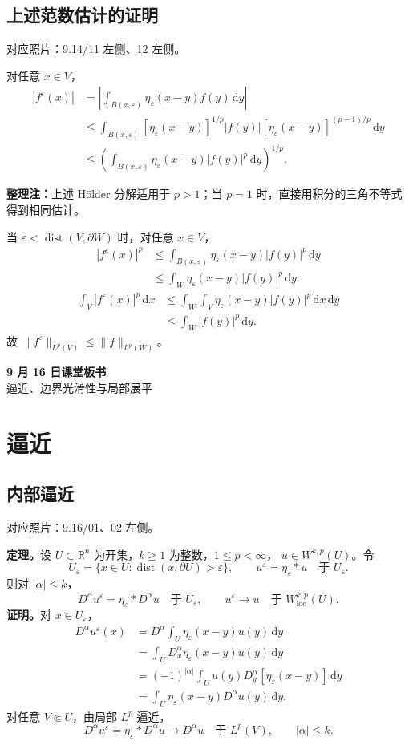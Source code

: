 \documentclass[UTF8,a4paper,11pt,fontset=fandol]{ctexart}
\newcommand{\R}{\mathbb R}
\newcommand{\dd}{\,\mathrm d}
\newcommand{\ednote}[1]{\par{\small\color{notegray}\textbf{整理注：}#1}\par}
\newcommand{\source}[1]{{\small\color{notegray}对应照片：#1。}\par}
\begin{document}
\subsection*{上述范数估计的证明}
\source{9.14/11 左侧、12 左侧}
对任意 $x\in V$，
\[
\begin{aligned}
|f^\varepsilon(x)|
&=\left|\int_{B(x,\varepsilon)}\eta_\varepsilon(x-y)f(y)\dd y\right|\\
&\leq\int_{B(x,\varepsilon)}[\eta_\varepsilon(x-y)]^{1/p}|f(y)|
[\eta_\varepsilon(x-y)]^{(p-1)/p}\dd y\\
&\leq\left(\int_{B(x,\varepsilon)}\eta_\varepsilon(x-y)|f(y)|^p\dd y\right)^{1/p}.
\end{aligned}
\]
\ednote{上述 Hölder 分解适用于 $p>1$；当 $p=1$ 时，直接用积分的三角不等式得到相同估计。}
当 $\varepsilon<\operatorname{dist}(V,\partial W)$ 时，对任意 $x\in V$，
\[
\begin{aligned}
|f^\varepsilon(x)|^p
&\leq\int_{B(x,\varepsilon)}\eta_\varepsilon(x-y)|f(y)|^p\dd y\\
&\leq\int_W\eta_\varepsilon(x-y)|f(y)|^p\dd y.
\end{aligned}
\]
\[
\begin{aligned}
\int_V|f^\varepsilon(x)|^p\dd x
&\leq\int_W\int_V\eta_\varepsilon(x-y)|f(y)|^p\dd x\dd y\\
&\leq\int_W|f(y)|^p\dd y.
\end{aligned}
\]
故 $\|f^\varepsilon\|_{L^p(V)}\leq\|f\|_{L^p(W)}$。

\clearpage
{}
\begin{center}
{\LARGE\bfseries 9 月 16 日课堂板书}\\[4pt]
{逼近、边界光滑性与局部展平}
\end{center}
\section{逼近}
\subsection{内部逼近}
\source{9.16/01、02 左侧}
\textbf{定理。}设 $U\subset\R^n$ 为开集，$k\geq1$ 为整数，$1\leq p<\infty$，
$u\in W^{k,p}(U)$。令
\[
U_\varepsilon=\{x\in U:\operatorname{dist}(x,\partial U)>\varepsilon\},
\qquad u^\varepsilon=\eta_\varepsilon*u\quad\text{于 }U_\varepsilon.
\]
则对 $|\alpha|\leq k$，
\[
\boxed{D^\alpha u^\varepsilon=\eta_\varepsilon*D^\alpha u\quad\text{于 }U_\varepsilon,}
\qquad
u^\varepsilon\longrightarrow u\quad\text{于 }W_{\mathrm{loc}}^{k,p}(U).
\]
\textbf{证明。}对 $x\in U_\varepsilon$，
\[
\begin{aligned}
D^\alpha u^\varepsilon(x)
&=D^\alpha\int_U\eta_\varepsilon(x-y)u(y)\dd y\\
&=\int_U D_x^\alpha\eta_\varepsilon(x-y)u(y)\dd y\\
&=(-1)^{|\alpha|}\int_U u(y)D_y^\alpha[\eta_\varepsilon(x-y)]\dd y\\
&=\int_U\eta_\varepsilon(x-y)D^\alpha u(y)\dd y.
\end{aligned}
\]
对任意 $V\Subset U$，由局部 $L^p$ 逼近，
\[
D^\alpha u^\varepsilon=\eta_\varepsilon*D^\alpha u
\longrightarrow D^\alpha u\quad\text{于 }L^p(V),\qquad |\alpha|\leq k.
\]
\end{document}
